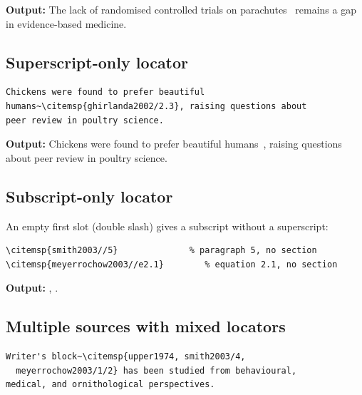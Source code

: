 \documentclass[11pt, a4paper]{article}
\begin{document}
\noindent\textbf{Output:} The lack of randomised controlled trials on
parachutes~ remains a gap in evidence-based
medicine.


\subsection{Superscript-only locator}

\begin{tcolorbox}[colback=blue!3, colframe=blue!30, boxrule=0.5pt, arc=2pt,
  top=6pt, bottom=6pt, left=10pt, right=10pt]
\begin{verbatim}
Chickens were found to prefer beautiful
humans~\citemsp{ghirlanda2002/2.3}, raising questions about
peer review in poultry science.
\end{verbatim}
\end{tcolorbox}

\noindent\textbf{Output:} Chickens were found to prefer beautiful
humans~, raising questions about peer review
in poultry science.


\subsection{Subscript-only locator}

An empty first slot (double slash) gives a subscript without a superscript:

\begin{tcolorbox}[colback=blue!3, colframe=blue!30, boxrule=0.5pt, arc=2pt,
  top=6pt, bottom=6pt, left=10pt, right=10pt]
\begin{verbatim}
\citemsp{smith2003//5}              % paragraph 5, no section
\citemsp{meyerrochow2003//e2.1}        % equation 2.1, no section
\end{verbatim}
\end{tcolorbox}

\noindent\textbf{Output:}
,\enspace
{}.


\subsection{Multiple sources with mixed locators}

\begin{tcolorbox}[colback=blue!3, colframe=blue!30, boxrule=0.5pt, arc=2pt,
  top=6pt, bottom=6pt, left=10pt, right=10pt]
\begin{verbatim}
Writer's block~\citemsp{upper1974, smith2003/4,
  meyerrochow2003/1/2} has been studied from behavioural,
medical, and ornithological perspectives.
\end{verbatim}
\end{tcolorbox}
\end{document}

